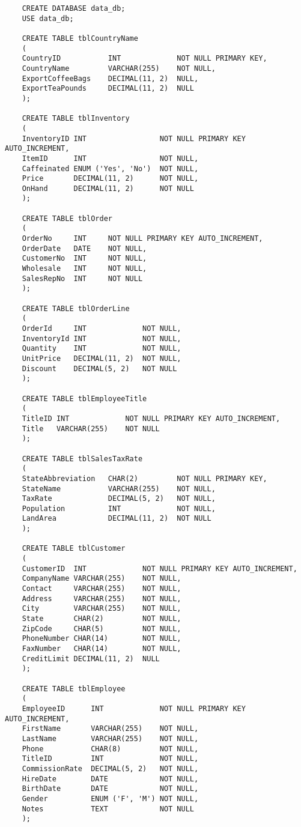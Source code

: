 \documentclass[12pt,titlepage]{article}
\begin{document}
\begin{verbatim}
    CREATE DATABASE data_db;
    USE data_db;

    CREATE TABLE tblCountryName
    (
    CountryID           INT             NOT NULL PRIMARY KEY,
    CountryName         VARCHAR(255)    NOT NULL,
    ExportCoffeeBags    DECIMAL(11, 2)  NULL,
    ExportTeaPounds     DECIMAL(11, 2)  NULL
    );

    CREATE TABLE tblInventory
    (
    InventoryID INT                 NOT NULL PRIMARY KEY AUTO_INCREMENT,
    ItemID      INT                 NOT NULL,
    Caffeinated ENUM ('Yes', 'No')  NOT NULL,
    Price       DECIMAL(11, 2)      NOT NULL,
    OnHand      DECIMAL(11, 2)      NOT NULL
    );

    CREATE TABLE tblOrder
    (
    OrderNo     INT     NOT NULL PRIMARY KEY AUTO_INCREMENT,
    OrderDate   DATE    NOT NULL,
    CustomerNo  INT     NOT NULL,
    Wholesale   INT     NOT NULL,
    SalesRepNo  INT     NOT NULL
    );

    CREATE TABLE tblOrderLine
    (
    OrderId     INT             NOT NULL,
    InventoryId INT             NOT NULL,
    Quantity    INT             NOT NULL,
    UnitPrice   DECIMAL(11, 2)  NOT NULL,
    Discount    DECIMAL(5, 2)   NOT NULL
    );

    CREATE TABLE tblEmployeeTitle
    (
    TitleID INT             NOT NULL PRIMARY KEY AUTO_INCREMENT,
    Title   VARCHAR(255)    NOT NULL
    );

    CREATE TABLE tblSalesTaxRate
    (
    StateAbbreviation   CHAR(2)         NOT NULL PRIMARY KEY,
    StateName           VARCHAR(255)    NOT NULL,
    TaxRate             DECIMAL(5, 2)   NOT NULL,
    Population          INT             NOT NULL,
    LandArea            DECIMAL(11, 2)  NOT NULL
    );

    CREATE TABLE tblCustomer
    (
    CustomerID  INT             NOT NULL PRIMARY KEY AUTO_INCREMENT,
    CompanyName VARCHAR(255)    NOT NULL,
    Contact     VARCHAR(255)    NOT NULL,
    Address     VARCHAR(255)    NOT NULL,
    City        VARCHAR(255)    NOT NULL,
    State       CHAR(2)         NOT NULL,
    ZipCode     CHAR(5)         NOT NULL,
    PhoneNumber CHAR(14)        NOT NULL,
    FaxNumber   CHAR(14)        NOT NULL,
    CreditLimit DECIMAL(11, 2)  NULL
    );

    CREATE TABLE tblEmployee
    (
    EmployeeID      INT             NOT NULL PRIMARY KEY AUTO_INCREMENT,
    FirstName       VARCHAR(255)    NOT NULL,
    LastName        VARCHAR(255)    NOT NULL,
    Phone           CHAR(8)         NOT NULL,
    TitleID         INT             NOT NULL,
    CommissionRate  DECIMAL(5, 2)   NOT NULL,
    HireDate        DATE            NOT NULL,
    BirthDate       DATE            NOT NULL,
    Gender          ENUM ('F', 'M') NOT NULL,
    Notes           TEXT            NOT NULL
    );


\end{verbatim}
\end{document}
